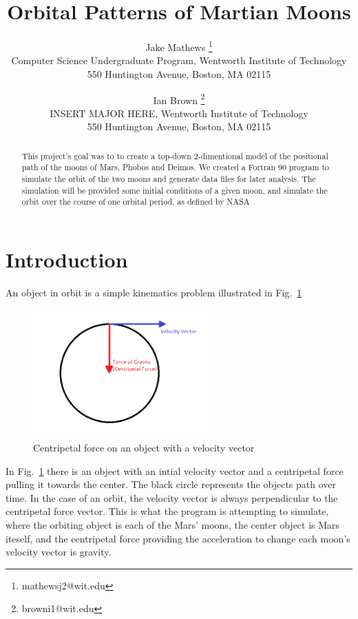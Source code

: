 \documentclass[11pt]{article}
\begin{document}
\title{\textbf{Orbital Patterns of Martian Moons}}

\author{Jake Mathews
\thanks{mathewsj2@wit.edu}\\
Computer Science Undergraduate Program, Wentworth Institute of Technology\\
550 Huntington Avenue, Boston, MA 02115\\
\and Ian Brown
\thanks{browni1@wit.edu}\\
INSERT MAJOR HERE, Wentworth Institute of Technology\\
550 Huntington Avenue, Boston, MA 02115}

\maketitle

\begin{abstract}

This project's goal was to to create a top-down 2-dimentional model
of the positional path of the moons of Mars, Phobos and Deimos.
We created a Fortran 90 program to simulate the orbit of the two moons
and generate data files for later analysis.
The simulation will be provided some initial conditions of a given moon,
and simulate the orbit over the course of one orbital period, as defined
by NASA~\cite{nasa}

\end{abstract}




\section{Introduction}
An object in orbit is a simple kinematics problem illustrated in Fig.~\ref{fig:centripetal}

\begin{figure}[ht]
  \centering
  \includegraphics[width=0.6\textwidth, angle =0]{../images/centripetal-force}
  \caption{Centripetal force on an object with a velocity vector}
  \label{fig:centripetal}
\end{figure}
\noindent
In Fig.~\ref{fig:centripetal} there is an object with an intial velocity vector
and a centripetal force pulling it towards the center. The black circle represents
the objects path over time. In the case of an orbit, the velocity vector is always 
perpendicular to the centripetal force vector. This is what the program is attempting to simulate,
where the orbiting object is each of the Mars' moons, the center object is Mars
iteself, and the centripetal force providing the acceleration to change each moon's
velocity vector is gravity.
\end{document}
